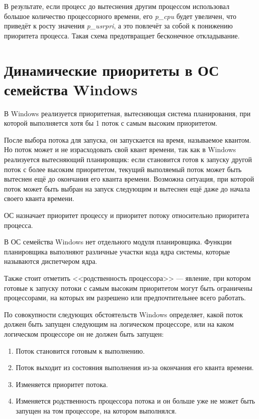 В результате, если процесс до вытеснения другим процессом использовал большое 
количество процессорного времени, его \textit{p\_cpu} будет увеличен, что приведёт к 
росту значения \textit{p\_usrpri}, а это повлечёт за собой к понижению приоритета 
процесса. Такая схема предотвращает бесконечное откладывание.

\section[Динамические приоритеты в ОС семейства Windows]{Динамические приоритеты в ОС \\семейства Windows}

В Windows реализуется приоритетная, вытесняющая система планирования, 
при которой выполняется хотя бы 1 поток с самым высоким приоритетом.

После выбора потока для запуска, он запускается на время, называемое квантом.
Но поток может и не израсходовать свой квант времени, так как в Windows реализуется вытесняющий планировщик:
 если становится готов к запуску другой поток с более высоким приоритетом, текущий выполяемый поток может быть вытеснен ещё до окончания его кванта времени.
Возможна ситуация, при которой поток может быть выбран на запуск следующим и вытеснен ещё даже до начала своего кванта времени.

ОС назначает приоритет процессу и приоритет потоку относительно приоритета процесса.
 
В ОС семейства Windows нет отдельного модуля планировщика. 
Функции планировщика выполняют различные участки кода ядра системы, 
которые называются диспетчером ядра.

Также стоит отметить <<родственность процессора>> --- явление, 
при котором готовые к запуску потоки с самым
высоким приоритетом могут быть ограничены
процессорами, на которых
им разрешено или предпочтительнее всего работать.

По совокупности следующих обстоятельств Windows определяет,
какой поток должен быть запущен следующим на логическом процессоре, или 
на каком логическом процессоре он не должен быть запущен:

\begin{enumerate}
	\item Поток становится готовым к выполнению.
	\item Поток выходит из состояния выполнения из-за окончания его кванта времени.
	\item Изменяется приоритет потока.
	\item Изменяется родственность процессора потока и он больше уже не может 
	быть запущен на том процессоре, на котором выполнялся.
\end{enumerate}


